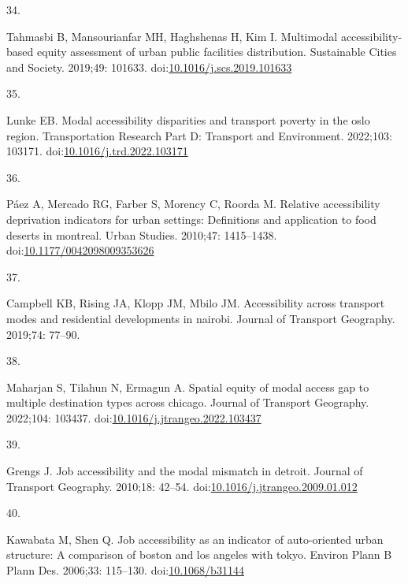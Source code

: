 \documentclass[10pt,letterpaper]{article}
\newlength{\cslhangindent}
\newlength{\csllabelwidth}
\newlength{\cslentryspacingunit} %
\newenvironment{CSLReferences}[2] %
 {%
  \setlength{\parindent}{0pt}
  \ifodd #1
  \let\oldpar\par
  \def\par{\hangindent=\cslhangindent\oldpar}
  \fi
  \setlength{\parskip}{#2\cslentryspacingunit}
 }%
 {}
\newcommand{\CSLLeftMargin}[1]{\parbox[t]{\csllabelwidth}{#1}}
\newcommand{\CSLRightInline}[1]{\parbox[t]{\linewidth - \csllabelwidth}{#1}\break}
\begin{document}
\begin{CSLReferences}{0}{0}
\leavevmode{}%
\CSLLeftMargin{34. }%
\CSLRightInline{Tahmasbi B, Mansourianfar MH, Haghshenas H, Kim I.
Multimodal accessibility-based equity assessment of urban public
facilities distribution. Sustainable Cities and Society. 2019;49:
101633.
doi:\href{https://doi.org/10.1016/j.scs.2019.101633}{10.1016/j.scs.2019.101633}}

\leavevmode{}%
\CSLLeftMargin{35. }%
\CSLRightInline{Lunke EB. Modal accessibility disparities and transport
poverty in the oslo region. Transportation Research Part D: Transport
and Environment. 2022;103: 103171.
doi:\href{https://doi.org/10.1016/j.trd.2022.103171}{10.1016/j.trd.2022.103171}}

\leavevmode{}%
\CSLLeftMargin{36. }%
\CSLRightInline{Páez A, Mercado RG, Farber S, Morency C, Roorda M.
Relative accessibility deprivation indicators for urban settings:
Definitions and application to food deserts in montreal. Urban Studies.
2010;47: 1415--1438.
doi:\href{https://doi.org/10.1177/0042098009353626}{10.1177/0042098009353626}}

\leavevmode{}%
\CSLLeftMargin{37. }%
\CSLRightInline{Campbell KB, Rising JA, Klopp JM, Mbilo JM.
Accessibility across transport modes and residential developments in
nairobi. Journal of Transport Geography. 2019;74: 77--90. }

\leavevmode{}%
\CSLLeftMargin{38. }%
\CSLRightInline{Maharjan S, Tilahun N, Ermagun A. Spatial equity of
modal access gap to multiple destination types across chicago. Journal
of Transport Geography. 2022;104: 103437.
doi:\href{https://doi.org/10.1016/j.jtrangeo.2022.103437}{10.1016/j.jtrangeo.2022.103437}}

\leavevmode{}%
\CSLLeftMargin{39. }%
\CSLRightInline{Grengs J. Job accessibility and the modal mismatch in
detroit. Journal of Transport Geography. 2010;18: 42--54.
doi:\href{https://doi.org/10.1016/j.jtrangeo.2009.01.012}{10.1016/j.jtrangeo.2009.01.012}}

\leavevmode{}%
\CSLLeftMargin{40. }%
\CSLRightInline{Kawabata M, Shen Q. Job accessibility as an indicator of
auto-oriented urban structure: A comparison of boston and los angeles
with tokyo. Environ Plann B Plann Des. 2006;33: 115--130.
doi:\href{https://doi.org/10.1068/b31144}{10.1068/b31144}}


\end{CSLReferences}
\end{document}
